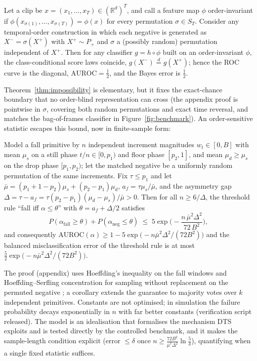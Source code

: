 \begin{theorem}\label{thm:impossibility}
Let a clip be $x=(x_1,\dots,x_T)\in(\mathbb{R}^d)^T$, and call a feature map $\phi$ order-invariant if $\phi(x_{\sigma(1)},\dots,x_{\sigma(T)})=\phi(x)$ for every permutation $\sigma\in S_T$. Consider any temporal-order construction in which each negative is generated as $X^-=\sigma(X^+)$ with $X^+\sim P_+$ and $\sigma$ a (possibly random) permutation independent of $X^+$. Then for any classifier $g=h\circ\phi$ built on an order-invariant $\phi$, the class-conditional score laws coincide, $g(X^-)\stackrel{d}{=}g(X^+)$; hence the ROC curve is the diagonal, $\mathrm{AUROC}=\tfrac12$, and the Bayes error is $\tfrac12$.
\end{theorem}
Theorem~\ref{thm:impossibility} is elementary, but it fixes the exact-chance boundary that no order-blind representation can cross (the appendix proof is pointwise in $\sigma$, covering both random permutations and exact time reversal, and matches the bag-of-frames classifier in Figure~\ref{fig:benchmark}). An order-sensitive statistic escapes this bound, now in finite-sample form:

\begin{theorem}\label{thm:finite}
Model a fall primitive by $n$ independent increment magnitudes $w_t\in[0,B]$ with mean $\mu_s$ on a still phase $t/n\in[0,p_1)$ and floor phase $[p_2,1]$, and mean $\mu_d\geq\mu_s$ on the drop phase $[p_1,p_2)$; let the matched negative be a uniformly random permutation of the same increments. Fix $\tau\leq p_1$ and let $\bar\mu=(p_1{+}1{-}p_2)\mu_s+(p_2{-}p_1)\mu_d$, $a_f=\tau\mu_s/\bar\mu$, and the asymmetry gap $\Delta=\tau-a_f=\tau(p_2{-}p_1)(\mu_d{-}\mu_s)/\bar\mu>0$. Then for all $n\geq 6/\Delta$, the threshold rule ``fall iff $\alpha\leq\theta$'' with $\theta=a_f+\Delta/2$ satisfies
\begin{equation}
P(\alpha_{\mathrm{fall}}\geq\theta)+P(\alpha_{\mathrm{neg}}\leq\theta)\;\leq\;5\exp\!\Big(-\frac{n\,\bar\mu^{2}\Delta^{2}}{72\,B^{2}}\Big),
\label{eq:finite}
\end{equation}
and consequently $\mathrm{AUROC}(\alpha)\geq 1-5\exp\!\big(-n\bar\mu^2\Delta^2/(72B^2)\big)$ and the balanced misclassification error of the threshold rule is at most $\tfrac52\exp\!\big(-n\bar\mu^2\Delta^2/(72B^2)\big)$.
\end{theorem}

The proof (appendix) uses Hoeffding's inequality on the fall windows and Hoeffding--Serfling concentration for sampling without replacement on the permuted negative \citep{hoeffding1963,serfling1974}; a corollary extends the guarantee to majority votes over $k$ independent primitives. Constants are not optimised; in simulation the failure probability decays exponentially in $n$ with far better constants (verification script released). The model is an idealisation that formalises the mechanism DTS exploits and is tested directly by the controlled benchmark, and it makes the sample-length condition explicit (error $\leq\delta$ once $n\geq \frac{72B^2}{\bar\mu^2\Delta^2}\ln\frac{5}{\delta}$), quantifying when a single fixed statistic suffices.

